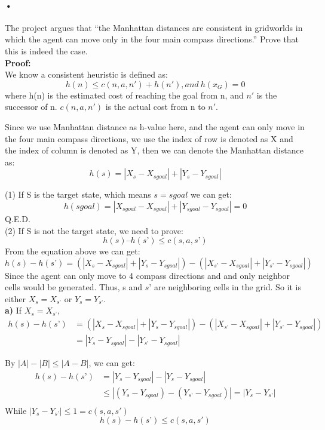 \documentclass[11pt]{report}
\begin{document}
\paragraph{•}
The project argues that “the Manhattan distances are consistent in gridworlds in which the agent can move only in the four main compass directions.” Prove that this is indeed the case.\\

\textbf{Proof:}\\

We know a consistent heuristic is defined as:
$$h(n) \leq c(n, a, n')+h(n'), and\ h(x_G)=0$$ where h(n) is the estimated cost of reaching the goal from n, and $n'$ is the successor of n. $c(n, a, n')$ is the actual cost from n to $n'$.

Since we use Manhattan distance as h-value here, and the agent can only move in the four main compass directions, we use the index of row is denoted as X and the index of column is denoted as Y, then we can denote the Manhattan distance as:
$$h(s) = |X_s- X_{sgoal}| + |Y_s  - Y_{sgoal}|$$

(1) If S is the target state, which means $s = sgoal$ we can get:
$$h(sgoal) = |X_{sgoal} - X_{sgoal}| + |Y_{sgoal} - Y_{sgoal}| = 0$$
\hspace{20mm} Q.E.D.\\

\indent (2) If S is not the target state, we need to prove: $$h(s) – h(s’) \leq c(s, a, s’)$$
From the equation above we can get:
$$h(s) - h(s’) = (|X_s -X_{sgoal}| + |Y_s -Y_{sgoal}|) - (|X_{s’} -X_{sgoal}| + |Y_{s’} -Y_{sgoal}|)$$
Since the agent can only move to 4 compass directions and and only neighbor cells would be generated. Thus, s and $s’$ are neighboring cells in the grid. So it is either $X_s = X_{s’}$ or $Y_s = Y_{s’}$.\\

\indent \textbf{a)} If $X_s = X_{s’}$,
\begin{align*}
h(s) - h(s’) 
& =(|X_s -X_{sgoal}| + |Y_s -Y_{sgoal}|) - (|X_{s’} -X_{sgoal}| + |Y_{s’} -Y_{sgoal}|)  \\
& = |Y_s -Y_{sgoal}| - |Y_{s’} -Y_{sgoal}|
\end{align*}

\noindent By $|A| - |B| \leq |A-B|$, we can get:
\begin{align*}
h(s) - h(s’) 
& =|Y_s -Y_{sgoal}| - |Y_s -Y_{sgoal}|  \\
& \leq |(Y_s -Y_{sgoal}) - (Y_{s’} - Y_{sgoal})| = |Y_s - Y_{s’} | \\
\end{align*}
While $|Y_s - Y_{s’} | \leq 1 = c(s, a, s')$
$$h(s) - h(s’) \leq c(s, a, s')$$\\
\end{document}
